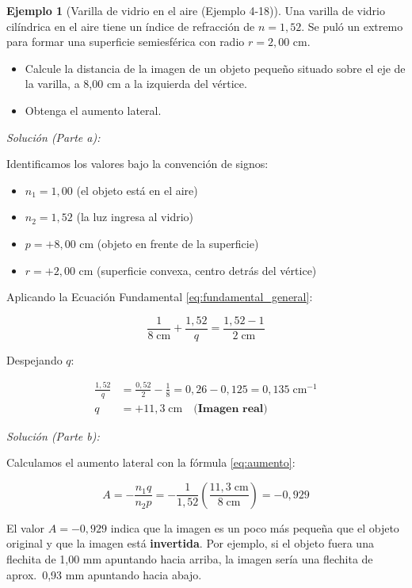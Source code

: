 \documentclass[12pt, a4paper]{article}
\theoremstyle{definition}
\newtheorem{ejemplo}{Ejemplo}[section]
\begin{document}
\begin{ejemplo}[Varilla de vidrio en el aire (Ejemplo 4-18)]
Una varilla de vidrio cilíndrica en el aire tiene un índice de refracción de \(n = 1{,}52\).
Se puló un extremo para formar una superficie semiesférica con radio \(r = 2{,}00\) cm.

\begin{itemize}
  \item[\textbf{a)}] Calcule la distancia de la imagen de un objeto pequeño situado sobre
        el eje de la varilla, a 8,00 cm a la izquierda del vértice.
  \item[\textbf{b)}] Obtenga el aumento lateral.
\end{itemize}

\textit{Solución (Parte a):}

Identificamos los valores bajo la convención de signos:
\begin{itemize}
  \item \(n_1 = 1{,}00\) (el objeto está en el aire)
  \item \(n_2 = 1{,}52\) (la luz ingresa al vidrio)
  \item \(p = +8{,}00\) cm (objeto en frente de la superficie)
  \item \(r = +2{,}00\) cm (superficie convexa, centro detrás del vértice)
\end{itemize}

Aplicando la Ecuación Fundamental \eqref{eq:fundamental_general}:

\[
  \frac{1}{8\;\text{cm}} + \frac{1{,}52}{q} = \frac{1{,}52 - 1}{2\;\text{cm}}
\]

Despejando \(q\):

\begin{align*}
  \frac{1{,}52}{q} &= \frac{0{,}52}{2} - \frac{1}{8} = 0{,}26 - 0{,}125 = 0{,}135\;\text{cm}^{-1} \\
  q &= +11{,}3\;\text{cm} \quad \textbf{(Imagen real)}
\end{align*}

\textit{Solución (Parte b):}

Calculamos el aumento lateral con la fórmula \eqref{eq:aumento}:

\[
  A = -\frac{n_1 q}{n_2 p} = -\frac{1}{1{,}52}\left(\frac{11{,}3\;\text{cm}}{8\;\text{cm}}\right)
  = -0{,}929
\]

El valor \(A = -0{,}929\) indica que la imagen es un poco más pequeña que el objeto
original y que la imagen está \textbf{invertida}. Por ejemplo, si el objeto fuera una
flechita de 1,00 mm apuntando hacia arriba, la imagen sería una flechita de aprox.\ 0,93
mm apuntando hacia abajo.
\end{ejemplo}
\end{document}
